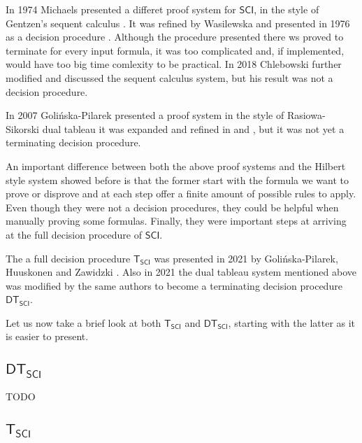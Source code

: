 \documentclass{article}
\theoremstyle{definition}
\theoremstyle{definition}
\theoremstyle{definition}
\newcommand{\SCI}{$\mathsf{SCI}$\xspace}
\newcommand{\TSCI}{$\mathsf{T_{SCI}}$\xspace}
\newcommand{\DTSCI}{$\mathsf{DT_{SCI}}$\xspace}
\begin{document}
In 1974 Michaels presented a differet proof system for \SCI, in the style of
Gentzen's sequent calculus \cite{michaels}. It was refined by Wasilewska and
presented in 1976 as a decision procedure \cite{wasilewska}. Although the
procedure presented there ws proved to terminate for every input formula, it
was too complicated and, if implemented, would have too big time comlexity to
be practical. In 2018 Chlebowski further modified and discussed the sequent
calculus system, but his result was not a decision procedure.

In 2007 Golińska-Pilarek presented a proof system in the style of
Rasiowa-Sikorski dual tableau \cite{jgp_2007} it was expanded and refined in
\cite{jgp_book} and \cite{jgp_2019}, but it was not yet a terminating decision
procedure.

An important difference between both the above proof systems and the Hilbert
style system showed before is that the former start with the formula we want to
prove or disprove and at each step offer a finite amount of possible rules to
apply. Even though they were not a decision procedures, they could be helpful
when manually proving some formulas. Finally, they were important steps at
arriving at the full decision procedure of \SCI.

The a full decision procedure \TSCI was presented in 2021 by Golińska-Pilarek,
Huuskonen and Zawidzki \cite{jgp_t_procedure}. Also in 2021 the dual tableau
system mentioned above was modified by the same authors to become a terminating
decision procedure \DTSCI \cite{jgp_dt_procedure}.

Let us now take a brief look at both \TSCI and \DTSCI, starting with the latter
as it is easier to present.

\subsection{\DTSCI}

TODO

\subsection{\TSCI}
\end{document}
